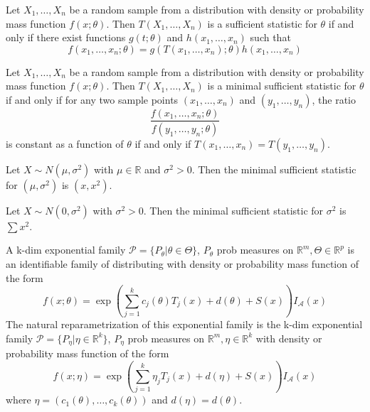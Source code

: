 \documentclass[answers,12pt,addpoints]{exam}
\begin{document}
\begin{theorem}
     Let $X_1, \ldots, X_n$ be a random sample from a distribution with density or probability mass function $f(x; \theta)$. Then $T(X_1, \ldots, X_n)$ is a sufficient statistic for $\theta$ if and only if there exist functions $g(t; \theta)$ and $h(x_1, \ldots, x_n)$ such that
    $$ f(x_1, \ldots, x_n; \theta) = g(T(x_1, \ldots, x_n); \theta) h(x_1, \ldots, x_n)$$

\end{theorem}
\begin{theorem}
     Let $X_1, \ldots, X_n$ be a random sample from a distribution with density or probability mass function $f(x; \theta)$. Then $T(X_1, \ldots, X_n)$ is a minimal sufficient statistic for $\theta$ if and only if for any two sample points $(x_1, \ldots, x_n)$ and $(y_1, \ldots, y_n)$, the ratio
    $$ \frac{f(x_1, \ldots, x_n; \theta)}{f(y_1, \ldots, y_n; \theta)}$$
    is constant as a function of $\theta$ if and only if $T(x_1, \ldots, x_n) = T(y_1, \ldots, y_n)$.

\end{theorem}
\begin{example}
    Let $X \sim N(\mu, \sigma^2)$ with $\mu \in \mathbb{R}$ and $\sigma^2 > 0$. Then the minimal sufficient statistic for $(\mu, \sigma^2)$ is $(x,x^2)$. 

    Let $X \sim N(0, \sigma^2)$ with $\sigma^2 > 0$. Then the minimal sufficient statistic for $\sigma^2$ is $\sum x^2$.
\end{example}
\begin{definition}
     A k-dim exponential family $\mathcal{P} = \{P_\theta | \theta \in \Theta\}$, $P_\theta$ prob measures on $\mathbb{R}^m, \Theta \in \mathbb{R}^p$ is an identifiable family of distributing with density or probability mass function of the form
    $$ f(x; \theta) = \exp\left( \sum_{j=1}^{k} c_j(\theta)T_j(x) + d(\theta) + S(x) \right) I_{\mathcal{A}}(x)$$
    The natural reparametrization of this exponential family is the k-dim exponential family $\mathcal{P} = \{P_\eta | \eta \in \mathbb{R}^k\}$, $P_\eta$ prob measures on $\mathbb{R}^m, \eta \in \mathbb{R}^k$ with density or probability mass function of the form
    $$ f(x; \eta) = \exp\left( \sum_{j=1}^{k} \eta_j T_j(x) + d(\eta) + S(x) \right) I_{\mathcal{A}}(x)$$
    where $\eta = (c_1(\theta), \ldots, c_k(\theta))$ and $d(\eta) = d(\theta)$.
\end{definition}
\end{document}
